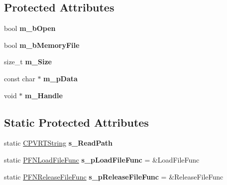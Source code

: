 \subsection*{Protected Attributes}
\begin{DoxyCompactItemize}
\item 
\hypertarget{class_c_p_v_r_t_resource_file_a0113f0853749ba67242015401aed2083}{bool {\bfseries m\+\_\+b\+Open}}\label{class_c_p_v_r_t_resource_file_a0113f0853749ba67242015401aed2083}

\item 
\hypertarget{class_c_p_v_r_t_resource_file_a82ef86109fc5e7a9fd28452469b338e7}{bool {\bfseries m\+\_\+b\+Memory\+File}}\label{class_c_p_v_r_t_resource_file_a82ef86109fc5e7a9fd28452469b338e7}

\item 
\hypertarget{class_c_p_v_r_t_resource_file_af7cbef6362baefd16211aeb2e0580dc4}{size\+\_\+t {\bfseries m\+\_\+\+Size}}\label{class_c_p_v_r_t_resource_file_af7cbef6362baefd16211aeb2e0580dc4}

\item 
\hypertarget{class_c_p_v_r_t_resource_file_af4c67ce3c2b0b6893fe5b066828edcd3}{const char $\ast$ {\bfseries m\+\_\+p\+Data}}\label{class_c_p_v_r_t_resource_file_af4c67ce3c2b0b6893fe5b066828edcd3}

\item 
\hypertarget{class_c_p_v_r_t_resource_file_a51f473069987bf0e9432ec6703565731}{void $\ast$ {\bfseries m\+\_\+\+Handle}}\label{class_c_p_v_r_t_resource_file_a51f473069987bf0e9432ec6703565731}

\end{DoxyCompactItemize}
\subsection*{Static Protected Attributes}
\begin{DoxyCompactItemize}
\item 
\hypertarget{class_c_p_v_r_t_resource_file_a20f1585cb93a8cda57770de1e54b60f4}{static \hyperlink{class_c_p_v_r_t_string}{C\+P\+V\+R\+T\+String} {\bfseries s\+\_\+\+Read\+Path}}\label{class_c_p_v_r_t_resource_file_a20f1585cb93a8cda57770de1e54b60f4}

\item 
\hypertarget{class_c_p_v_r_t_resource_file_aef965fcbf143f18e4e3a73938aff6f82}{static \hyperlink{_p_v_r_shell_8h_a4d494ca5d43f290e1a26b96c1b9884df}{P\+F\+N\+Load\+File\+Func} {\bfseries s\+\_\+p\+Load\+File\+Func} = \&Load\+File\+Func}\label{class_c_p_v_r_t_resource_file_aef965fcbf143f18e4e3a73938aff6f82}

\item 
\hypertarget{class_c_p_v_r_t_resource_file_afbfa6cca0f9a21838078359e1012c542}{static \hyperlink{_p_v_r_shell_8h_aac6afef35cfba693e617d8e877880a0c}{P\+F\+N\+Release\+File\+Func} {\bfseries s\+\_\+p\+Release\+File\+Func} = \&Release\+File\+Func}\label{class_c_p_v_r_t_resource_file_afbfa6cca0f9a21838078359e1012c542}

\end{DoxyCompactItemize}


